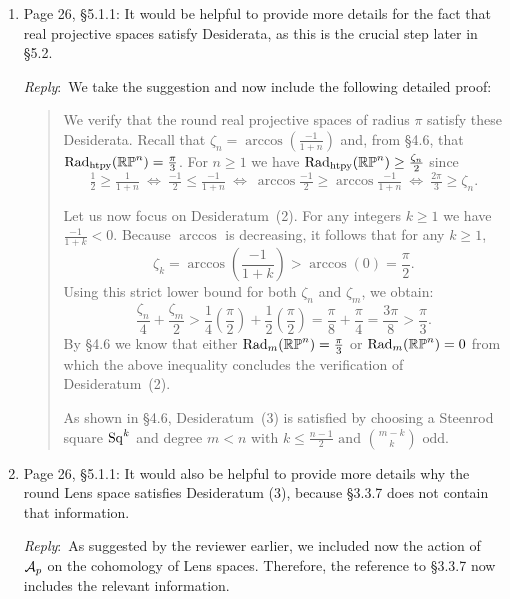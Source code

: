 \documentclass{amsart}
\newcommand{\ar}{\medskip\noindent\textit{Reply}:\ }
\begin{document}
\begin{enumerate}
		We have now clarified the coefficient choices and adjust the proof in \S4.7, providing a unified treatment of the odd and even cases and a more streamlined argument.

		\item Page 26, \S5.1.1: It would be helpful to provide more details for the fact that real projective spaces satisfy Desiderata, as this is the crucial step later in \S5.2.

		\ar We take the suggestion and now include the following detailed proof:

		\medskip
		\begin{quote}
			We verify that the round real projective spaces of radius \(\pi\) satisfy these Desiderata.
			Recall that \(\zeta_n = \arccos(\tfrac{-1}{1+n})\) and, from \S4.6, that \(\mathrm{Rad}_{\mathrm{htpy}}(\mathbb{RP}^n) = \tfrac{\pi}{3}\).
			For \(n \geq 1\) we have \(\mathrm{Rad}_{\mathrm{htpy}}(\mathbb{RP}^n) \geq \tfrac{\zeta_n}{2}\) since
			\[
			\tfrac{1}{2} \geq \tfrac{1}{1+n} \ \Leftrightarrow \
			\tfrac{-1}{2} \leq \tfrac{-1}{1+n} \ \Leftrightarrow \
			\arccos \tfrac{-1}{2} \geq \arccos\tfrac{-1}{1+n} \ \Leftrightarrow \
			\tfrac{2\pi}{3} \geq \zeta_n.
			\]

			Let us now focus on Desideratum~(2).
			For any integers $k \geq 1$ we have $\frac{-1}{1+k} < 0$.
			Because \(\arccos\) is decreasing, it follows that for any $k \geq 1$,
			\[
			\zeta_k = \arccos\left(\frac{-1}{1+k}\right) > \arccos(0) = \frac{\pi}{2}.
			\]
			Using this strict lower bound for both $\zeta_n$ and $\zeta_m$, we obtain:
			\[
			\frac{\zeta_n}{4} + \frac{\zeta_m}{2} > \frac{1}{4}\left(\frac{\pi}{2}\right) + \frac{1}{2}\left(\frac{\pi}{2}\right) = \frac{\pi}{8} + \frac{\pi}{4} = \frac{3\pi}{8} > \frac{\pi}{3}.
			\]
			By \S4.6 we know that either \(\mathrm{Rad}_{m}(\mathbb{RP}^n) = \tfrac{\pi}{3}\) or \(\mathrm{Rad}_{m}(\mathbb{RP}^n) = 0\) from which the above inequality concludes the verification of Desideratum~(2).

			As shown in \S4.6, Desideratum~(3) is satisfied by choosing a Steenrod square \(\mathrm{Sq}^k\) and degree \(m < n\) with \(k \leq \frac{n-1}{2} \text{ and } \binom{m-k}{k} \text{ odd}\).
		\end{quote}

		\item Page 26, \S5.1.1: It would also be helpful to provide more details why the round Lens space satisfies Desideratum (3), because \S3.3.7 does not contain that information.

		\ar As suggested by the reviewer earlier, we included now the action of \(\mathcal{A}_p\) on the cohomology of Lens spaces.
		Therefore, the reference to \S3.3.7 now includes the relevant information.


\end{enumerate}
\end{document}
